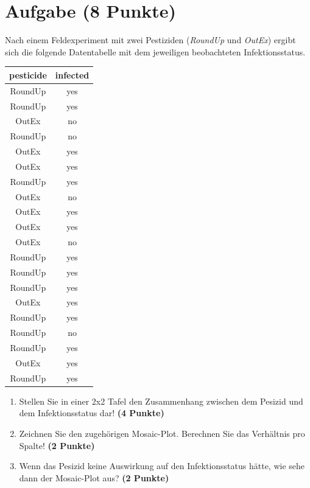 \documentclass[a4paper, 10pt]{scrartcl}\usepackage[]{graphicx}\usepackage[]{xcolor}
\begin{document}
\section{Aufgabe \hfill (8 Punkte)}

Nach einem Feldexperiment mit zwei Pestiziden (\textit{RoundUp} und
\textit{OutEx}) ergibt sich die folgende Datentabelle mit dem jeweiligen
beobachteten Infektionsstatus.

\begin{table}[!h]
\centering
\begin{tabular}{cc}
\toprule
pesticide & infected\\
\midrule
RoundUp & yes\\
RoundUp & yes\\
OutEx & no\\
RoundUp & no\\
OutEx & yes\\
\addlinespace
OutEx & yes\\
RoundUp & yes\\
OutEx & no\\
OutEx & yes\\
OutEx & yes\\
\addlinespace
OutEx & no\\
RoundUp & yes\\
RoundUp & yes\\
RoundUp & yes\\
OutEx & yes\\
\addlinespace
RoundUp & yes\\
RoundUp & no\\
RoundUp & yes\\
OutEx & yes\\
RoundUp & yes\\
\bottomrule
\end{tabular}
\end{table}



\begin{enumerate}
\item Stellen Sie in einer 2x2 Tafel den Zusammenhang zwischen dem
  Pesizid und dem Infektionsstatus dar! \textbf{(4 Punkte)}
\item Zeichnen Sie den zugeh{\"o}rigen Mosaic-Plot. Berechnen Sie das
  Verh{\"a}ltnis pro Spalte! \textbf{(2 Punkte)}
\item Wenn das Pesizid keine Auswirkung auf den Infektionsstatus h{\"a}tte, wie
  sehe dann der Mosaic-Plot aus? \textbf{(2 Punkte)}
\end{enumerate} 
\clearpage
\end{document}
